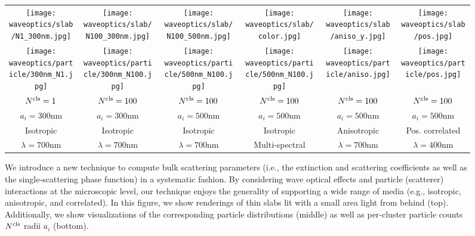 \begin{figure}[h]
    \centering
    \setlength{\resLen}{1.in}
    \addtolength{\tabcolsep}{-3pt}
    \small
    \begin{tabular}{cccccc}
        \texttt{[image: waveoptics/slab/N1\_300nm.jpg]} &
        \texttt{[image: waveoptics/slab/N100\_300nm.jpg]} &
        \texttt{[image: waveoptics/slab/N100\_500nm.jpg]} &
        \texttt{[image: waveoptics/slab/color.jpg]} & 
        \texttt{[image: waveoptics/slab/aniso\_y.jpg]} &
        \texttt{[image: waveoptics/slab/pos.jpg]}
        \\
        \texttt{[image: waveoptics/particle/300nm\_N1.jpg]} &
        \texttt{[image: waveoptics/particle/300nm\_N100.jpg]} &
        \texttt{[image: waveoptics/particle/500nm\_N100.jpg]} &
        \texttt{[image: waveoptics/particle/500nm\_N100.jpg]} &
        \texttt{[image: waveoptics/particle/aniso.jpg]} &
        \texttt{[image: waveoptics/particle/pos.jpg]}
        \\
        $N^\mathrm{cls}=1$   &
        $N^\mathrm{cls}=100$ &
        $N^\mathrm{cls}=100$ &
        $N^\mathrm{cls}=100$ & 
        $N^\mathrm{cls}=100$ &
        $N^\mathrm{cls}=100$
        \\
        $a_i=300\text{nm}$ &
		$a_i=300\text{nm}$ &
		$a_i=500\text{nm}$ &
		$a_i=500\text{nm}$ & 
		$a_i=500\text{nm}$ &
		$a_i=500\text{nm}$
		\\
        Isotropic & Isotropic & Isotropic & Isotropic & Anisotropic & Pos. correlated
        \\
        $\lambda=700\text{nm}$ &
        $\lambda=700\text{nm}$ &
        $\lambda=700\text{nm}$ &
        Multi-spectral &
        $\lambda=700\text{nm}$ &
        $\lambda=400\text{nm}$
    \end{tabular}
    \caption[Teaser]{\label{fig:waveoptics:teaser}
        We introduce a new technique to compute bulk scattering parameters (i.e., the extinction and scattering coefficients as well as the single-scattering phase function) in a systematic fashion. By considering wave optical effects and particle (scatterer) interactions at the microscopic level, our technique enjoys the generality of supporting a wide range of media (e.g., isotropic, anisotropic, and correlated).
        In this figure, we show renderings of thin slabs lit with a small area light from behind (top).
        Additionally, we show visualizations of the corresponding particle distributions (middle) as well as per-cluster particle counts~$N^\mathrm{cls}$ radii $a_i$ (bottom).
    }
\end{figure}
